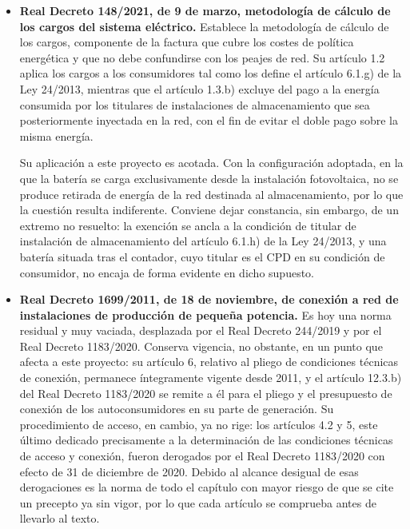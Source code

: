 \begin{itemize}
    \item \textbf{Real Decreto 148/2021, de 9 de marzo, metodología de cálculo de los cargos del sistema eléctrico.} Establece la metodología de cálculo de los cargos, componente de la factura que cubre los costes de política energética y que no debe confundirse con los peajes de red. Su artículo 1.2 aplica los cargos a los consumidores tal como los define el artículo 6.1.g) de la Ley 24/2013, mientras que el artículo 1.3.b) excluye del pago a la energía consumida por los titulares de instalaciones de almacenamiento que sea posteriormente inyectada en la red, con el fin de evitar el doble pago sobre la misma energía.

    Su aplicación a este proyecto es acotada. Con la configuración adoptada, en la que la batería se carga exclusivamente desde la instalación fotovoltaica, no se produce retirada de energía de la red destinada al almacenamiento, por lo que la cuestión resulta indiferente. Conviene dejar constancia, sin embargo, de un extremo no resuelto: la exención se ancla a la condición de titular de instalación de almacenamiento del artículo 6.1.h) de la Ley 24/2013, y una batería situada tras el contador, cuyo titular es el \ac{CPD} en su condición de consumidor, no encaja de forma evidente en dicho supuesto.

    \item \textbf{Real Decreto 1699/2011, de 18 de noviembre, de conexión a red de instalaciones de producción de pequeña potencia.} Es hoy una norma residual y muy vaciada, desplazada por el Real Decreto 244/2019 y por el Real Decreto 1183/2020. Conserva vigencia, no obstante, en un punto que afecta a este proyecto: su artículo 6, relativo al pliego de condiciones técnicas de conexión, permanece íntegramente vigente desde 2011, y el artículo 12.3.b) del Real Decreto 1183/2020 se remite a él para el pliego y el presupuesto de conexión de los autoconsumidores en su parte de generación. Su procedimiento de acceso, en cambio, ya no rige: los artículos 4.2 y 5, este último dedicado precisamente a la determinación de las condiciones técnicas de acceso y conexión, fueron derogados por el Real Decreto 1183/2020 con efecto de 31 de diciembre de 2020. Debido al alcance desigual de esas derogaciones es la norma de todo el capítulo con mayor riesgo de que se cite un precepto ya sin vigor, por lo que cada artículo se comprueba antes de llevarlo al texto.


\end{itemize}
